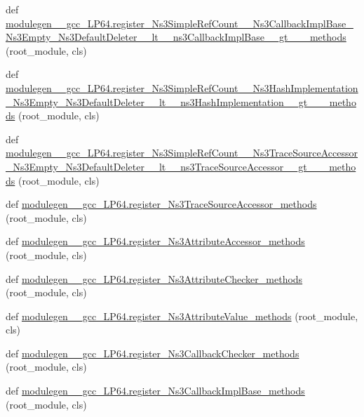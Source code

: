 \begin{DoxyCompactItemize}
\item 
def \hyperlink{namespacemodulegen____gcc__LP64_abad80b77479df17974cc787f14a2406f}{modulegen\+\_\+\+\_\+gcc\+\_\+\+L\+P64.\+register\+\_\+\+Ns3\+Simple\+Ref\+Count\+\_\+\+\_\+\+Ns3\+Callback\+Impl\+Base\+\_\+\+Ns3\+Empty\+\_\+\+Ns3\+Default\+Deleter\+\_\+\+\_\+lt\+\_\+\+\_\+ns3\+Callback\+Impl\+Base\+\_\+\+\_\+gt\+\_\+\+\_\+\+\_\+methods} (root\+\_\+module, cls)
\item 
def \hyperlink{namespacemodulegen____gcc__LP64_a38845cc78a4819d6d5632f27e6fd34d9}{modulegen\+\_\+\+\_\+gcc\+\_\+\+L\+P64.\+register\+\_\+\+Ns3\+Simple\+Ref\+Count\+\_\+\+\_\+\+Ns3\+Hash\+Implementation\+\_\+\+Ns3\+Empty\+\_\+\+Ns3\+Default\+Deleter\+\_\+\+\_\+lt\+\_\+\+\_\+ns3\+Hash\+Implementation\+\_\+\+\_\+gt\+\_\+\+\_\+\+\_\+methods} (root\+\_\+module, cls)
\item 
def \hyperlink{namespacemodulegen____gcc__LP64_a2971d479713881f4a0fb7f82a5a0c162}{modulegen\+\_\+\+\_\+gcc\+\_\+\+L\+P64.\+register\+\_\+\+Ns3\+Simple\+Ref\+Count\+\_\+\+\_\+\+Ns3\+Trace\+Source\+Accessor\+\_\+\+Ns3\+Empty\+\_\+\+Ns3\+Default\+Deleter\+\_\+\+\_\+lt\+\_\+\+\_\+ns3\+Trace\+Source\+Accessor\+\_\+\+\_\+gt\+\_\+\+\_\+\+\_\+methods} (root\+\_\+module, cls)
\item 
def \hyperlink{namespacemodulegen____gcc__LP64_abd8204bf10f1a73956889b2b56b0c2d3}{modulegen\+\_\+\+\_\+gcc\+\_\+\+L\+P64.\+register\+\_\+\+Ns3\+Trace\+Source\+Accessor\+\_\+methods} (root\+\_\+module, cls)
\item 
def \hyperlink{namespacemodulegen____gcc__LP64_a88b38d1f62a9078cdbfc0f0d77a01866}{modulegen\+\_\+\+\_\+gcc\+\_\+\+L\+P64.\+register\+\_\+\+Ns3\+Attribute\+Accessor\+\_\+methods} (root\+\_\+module, cls)
\item 
def \hyperlink{namespacemodulegen____gcc__LP64_a7a7d7cb7b6a065a93209b09c08d1c096}{modulegen\+\_\+\+\_\+gcc\+\_\+\+L\+P64.\+register\+\_\+\+Ns3\+Attribute\+Checker\+\_\+methods} (root\+\_\+module, cls)
\item 
def \hyperlink{namespacemodulegen____gcc__LP64_a91d88e3bac410892f68a8f1bfd117d79}{modulegen\+\_\+\+\_\+gcc\+\_\+\+L\+P64.\+register\+\_\+\+Ns3\+Attribute\+Value\+\_\+methods} (root\+\_\+module, cls)
\item 
def \hyperlink{namespacemodulegen____gcc__LP64_a1ef896a5bde844de40d219e98ceb0cee}{modulegen\+\_\+\+\_\+gcc\+\_\+\+L\+P64.\+register\+\_\+\+Ns3\+Callback\+Checker\+\_\+methods} (root\+\_\+module, cls)
\item 
def \hyperlink{namespacemodulegen____gcc__LP64_a27471f48136ec47282f70d414c0f7b6a}{modulegen\+\_\+\+\_\+gcc\+\_\+\+L\+P64.\+register\+\_\+\+Ns3\+Callback\+Impl\+Base\+\_\+methods} (root\+\_\+module, cls)

\end{DoxyCompactItemize}
